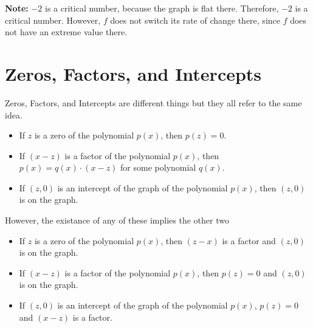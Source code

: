 \documentclass{ximera}
\begin{document}
\textbf{Note:} $-2$ is a critical number, because the graph is flat there.  Therefore, $-2$ is a critical number. However, $f$ does not switch its rate of change there, since $f$ does not have an extreme value there.










\section{Zeros, Factors, and Intercepts}




Zeros, Factors, and Intercepts are different things but they all refer to the same idea.



\begin{itemize}

\item If $z$ is a zero of the polynomial $p(x)$, then $p(z)=0$.


\item If $(x-z)$ is a factor of the polynomial $p(x)$, then $p(x) = q(x) \cdot (x-z)$ for some polynomial $q(x)$.


\item If $(z,0)$ is an intercept of the graph of the polynomial $p(x)$, then $(z,0)$ is on the graph.

\end{itemize}


However, the existance of any of these implies the other two






\begin{itemize}

\item If $z$ is a zero of the polynomial $p(x)$, then $(z-x)$ is a factor and $(z,0)$ is on the graph.


\item If $(x-z)$ is a factor of the polynomial $p(x)$, then $p(z)=0$ and $(z,0)$ is on the graph.


\item If $(z,0)$ is an intercept of the graph of the polynomial $p(x)$, $p(z)=0$ and $(x-z)$ is a factor.

\end{itemize}
\end{document}
